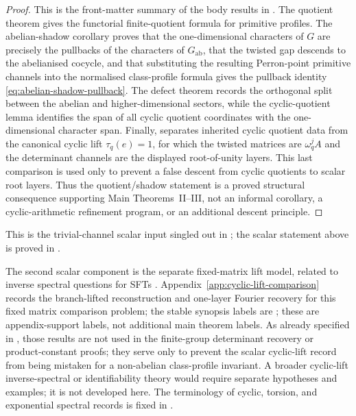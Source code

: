 \documentclass[11pt,a4paper]{amsart}
\theoremstyle{plain}
\theoremstyle{definition}
\theoremstyle{remark}
\begin{document}
\begin{proof}
This is the front-matter summary of the body results in
  .  The quotient theorem
  gives the functorial finite-quotient formula for primitive profiles.  The
  abelian-shadow corollary proves that the one-dimensional characters of
  \(G\) are precisely the pullbacks of the characters of
  \(G_{\mathrm{ab}}\), that the twisted gap descends to the abelianised
  cocycle, and that substituting the resulting Perron-point primitive
  channels into the normalised class-profile formula gives the pullback
  identity \eqref{eq:abelian-shadow-pullback}.  The defect theorem records
  the orthogonal split between the abelian and higher-dimensional sectors,
  while the cyclic-quotient lemma identifies the span of all cyclic quotient
  coordinates with the one-dimensional character span.  Finally,
   separates inherited cyclic
  quotient data from the canonical cyclic lift \(\tau_q(e)=1\), for which
  the twisted matrices are \(\omega_q^j A\) and the determinant channels are
  the displayed root-of-unity layers.  This last comparison is used only to
  prevent a false descent from cyclic quotients to scalar root layers.  Thus
  the quotient/shadow statement is a proved structural consequence supporting
  Main Theorems~II--III, not an informal corollary, a cyclic-arithmetic
  refinement program, or an additional descent principle.
\end{proof}


This is the trivial-channel scalar input singled out in
;
  the scalar statement above is proved in
.

The second scalar component is the separate fixed-matrix lift model,
related to inverse spectral questions for SFTs
\cite{LindMarcus1995}. Appendix~\ref{app:cyclic-lift-comparison} records the
branch-lifted reconstruction and one-layer Fourier recovery for this fixed
matrix comparison problem; the stable synopsis labels are
;
these are appendix-support labels, not additional main theorem labels.
As already specified in
, those results are not used in the
finite-group determinant recovery or product-constant proofs; they serve
only to prevent the scalar cyclic-lift record from being mistaken for a
non-abelian class-profile invariant.  A broader cyclic-lift inverse-spectral
or identifiability theory would require separate hypotheses and examples;
it is not developed here.  The terminology of cyclic, torsion,
and exponential spectral records is fixed in
.
\end{document}
